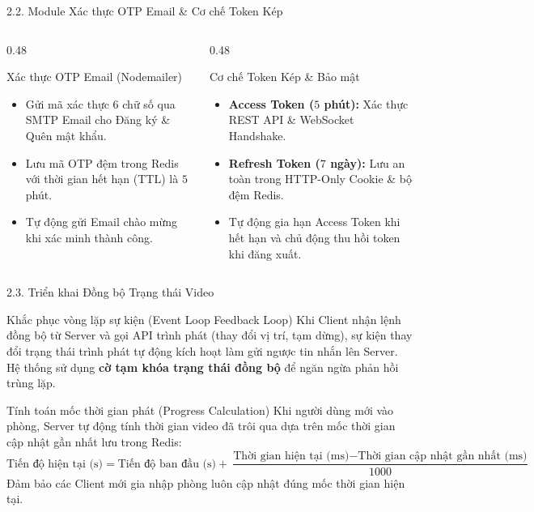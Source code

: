 \documentclass[aspectratio=169,11pt]{beamer}
\begin{document}
\begin{frame}{2.2. Module Xác thực OTP Email \& Cơ chế Token Kép}
    \begin{columns}[T]
        \begin{column}{0.48\textwidth}
            \begin{block}{Xác thực OTP Email (Nodemailer)}
                \begin{itemize}
                    \item Gửi mã xác thực 6 chữ số qua SMTP Email cho Đăng ký \& Quên mật khẩu.
                    \item Lưu mã OTP đệm trong Redis với thời gian hết hạn (TTL) là $5$ phút.
                    \item Tự động gửi Email chào mừng khi xác minh thành công.
                \end{itemize}
            \end{block}
        \end{column}

        \begin{column}{0.48\textwidth}
            \begin{block}{Cơ chế Token Kép \& Bảo mật}
                \begin{itemize}
                    \item \textbf{Access Token ($5$ phút):} Xác thực REST API \& WebSocket Handshake.
                    \item \textbf{Refresh Token ($7$ ngày):} Lưu an toàn trong HTTP-Only Cookie \& bộ đệm Redis.
                    \item Tự động gia hạn Access Token khi hết hạn và chủ động thu hồi token khi đăng xuất.
                \end{itemize}
            \end{block}
        \end{column}
    \end{columns}
\end{frame}

\begin{frame}{2.3. Triển khai Đồng bộ Trạng thái Video}
    \begin{block}{Khắc phục vòng lặp sự kiện (Event Loop Feedback Loop)}
        Khi Client nhận lệnh đồng bộ từ Server và gọi API trình phát (thay đổi vị trí, tạm dừng), sự kiện thay đổi trạng thái trình phát tự động kích hoạt làm gửi ngược tin nhắn lên Server. Hệ thống sử dụng \textbf{cờ tạm khóa trạng thái đồng bộ} để ngăn ngừa phản hồi trùng lặp.
    \end{block}
    
    \vspace{0.2cm}
    \begin{block}{Tính toán mốc thời gian phát (Progress Calculation)}
        Khi người dùng mới vào phòng, Server tự động tính thời gian video đã trôi qua dựa trên mốc thời gian cập nhật gần nhất lưu trong Redis:
        \[ \text{Tiến độ hiện tại (s)} = \text{Tiến độ ban đầu (s)} + \frac{\text{Thời gian hiện tại (ms)} - \text{Thời gian cập nhật gần nhất (ms)}}{1000} \]
        Đảm bảo các Client mới gia nhập phòng luôn cập nhật đúng mốc thời gian hiện tại.
    \end{block}
\end{frame}
\end{document}
